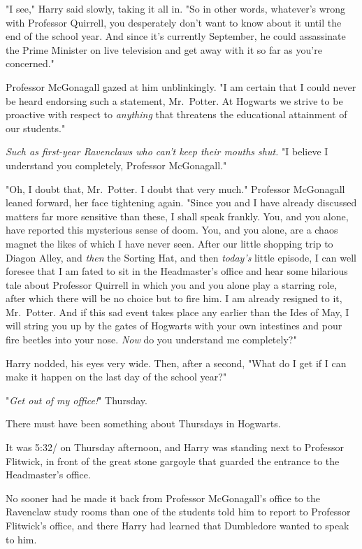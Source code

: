 "I see," Harry said slowly, taking it all in. "So in other words, whatever's
wrong with Professor Quirrell, you desperately don't want to know about it
until the end of the school year. And since it's currently September, he could
assassinate the Prime Minister on live television and get away with it so far
as you're concerned."

Professor McGonagall gazed at him unblinkingly. "I am certain that I could
never be heard endorsing such a statement, Mr.~Potter. At Hogwarts we strive to
be proactive with respect to \emph{anything} that threatens the educational
attainment of our students."

\emph{Such as first-year Ravenclaws who can't keep their mouths shut.} "I
believe I understand you completely, Professor McGonagall."

"Oh, I doubt that, Mr.~Potter. I doubt that very much." Professor McGonagall
leaned forward, her face tightening again. "Since you and I have already
discussed matters far more sensitive than these, I shall speak frankly. You,
and you alone, have reported this mysterious sense of doom. You, and you alone,
are a chaos magnet the likes of which I have never seen. After our little
shopping trip to Diagon Alley, and \emph{then} the Sorting Hat, and then
\emph{today's} little episode, I can well foresee that I am fated to sit in the
Headmaster's office and hear some hilarious tale about Professor Quirrell in
which you and you alone play a starring role, after which there will be no
choice but to fire him. I am already resigned to it, Mr.~Potter. And if this
sad event takes place any earlier than the Ides of May, I will string you up by
the gates of Hogwarts with your own intestines and pour fire beetles into your
nose. \emph{Now} do you understand me completely?"

Harry nodded, his eyes very wide. Then, after a second, "What do I get if I can
make it happen on the last day of the school year?"

"\emph{Get out of my office!}"
\sbreak
Thursday.

There must have been something about Thursdays in Hogwarts.

It was 5:32\PM/ on Thursday afternoon, and Harry was standing next to Professor
Flitwick, in front of the great stone gargoyle that guarded the entrance to the
Headmaster's office.

No sooner had he made it back from Professor McGonagall's office to the
Ravenclaw study rooms than one of the students told him to report to Professor
Flitwick's office, and there Harry had learned that Dumbledore wanted to speak
to him.

